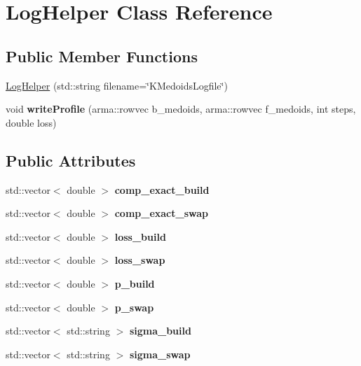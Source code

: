 \hypertarget{classLogHelper}{}\section{Log\+Helper Class Reference}
\label{classLogHelper}
\subsection*{Public Member Functions}
\begin{DoxyCompactItemize}
\item 
\hyperlink{classLogHelper_a4dd60abb04cadac82bd4b34edc931560}{Log\+Helper} (std\+::string filename=\char`\"{}K\+Medoids\+Logfile\char`\"{})
\item 
\mbox{\label{classLogHelper_a15b3f49bf98956a0585f036801e25dbe}} 
void {\bfseries write\+Profile} (arma\+::rowvec b\+\_\+medoids, arma\+::rowvec f\+\_\+medoids, int steps, double loss)
\end{DoxyCompactItemize}
\subsection*{Public Attributes}
\begin{DoxyCompactItemize}
\item 
\mbox{\label{classLogHelper_a7f9490e07d6bfc71b0d0fd555ca4f530}} 
std\+::vector$<$ double $>$ {\bfseries comp\+\_\+exact\+\_\+build}
\item 
\mbox{\label{classLogHelper_aaee1d830760c6b497f2fad31a0e368f8}} 
std\+::vector$<$ double $>$ {\bfseries comp\+\_\+exact\+\_\+swap}
\item 
\mbox{\label{classLogHelper_a8da7e85d166977478fcfe848bb739dfa}} 
std\+::vector$<$ double $>$ {\bfseries loss\+\_\+build}
\item 
\mbox{\label{classLogHelper_a3361ae9284a7fca5b867165e0380af4b}} 
std\+::vector$<$ double $>$ {\bfseries loss\+\_\+swap}
\item 
\mbox{\label{classLogHelper_aed75dac28380b3f67b777d6b36719aa9}} 
std\+::vector$<$ double $>$ {\bfseries p\+\_\+build}
\item 
\mbox{\label{classLogHelper_a87a35e651ad2a32092777e1d9bd4acfa}} 
std\+::vector$<$ double $>$ {\bfseries p\+\_\+swap}
\item 
\mbox{\label{classLogHelper_a835a54928567970dd564d9eaed87597c}} 
std\+::vector$<$ std\+::string $>$ {\bfseries sigma\+\_\+build}
\item 
\mbox{\label{classLogHelper_afee211952d9a61c217622557e91c1275}} 
std\+::vector$<$ std\+::string $>$ {\bfseries sigma\+\_\+swap}
\end{DoxyCompactItemize}


